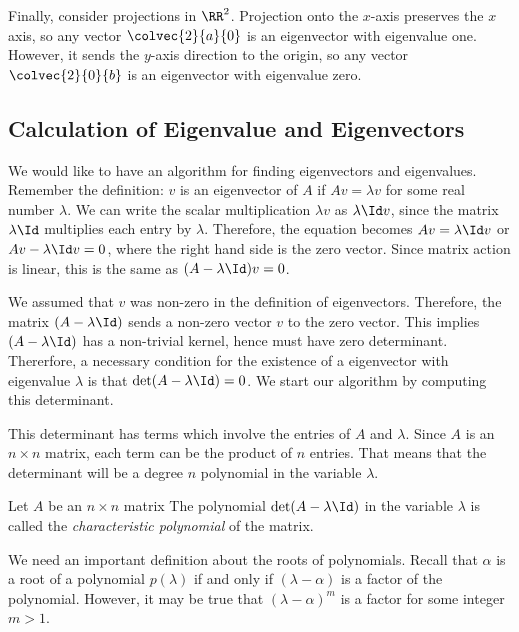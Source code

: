 \documentclass[fleqn]{report}
\begin{document}
\begin{example}
Finally, consider projections in $\RR^2$. Projection onto the
$x$-axis preserves the $x$ axis, so any vector
$\colvec{2}{a}{0}$ is an eigenvector with eigenvalue one.
However, it sends the $y$-axis direction to the origin, so any
vector $\colvec{2}{0}{b}$ is an eigenvector with eigenvalue
zero.
\end{example}

\subsection{Calculation of Eigenvalue and Eigenvectors}
\label{eigenvectors-calculation}

We would like to have an algorithm for finding eigenvectors
and eigenvalues. Remember the definition: $v$ is an
eigenvector of $A$ if $Av = \lambda v$ for some real number
$\lambda$. We can write the scalar multiplication $\lambda v$
as $\lambda \Id v$, since the matrix $\lambda \Id$ 
multiplies each entry by $\lambda$. Therefore, the equation
becomes $Av = \lambda \Id v$ or $Av - \lambda \Id v = 0$,
where the right hand side is the zero vector. Since matrix
action is linear, this is the same as $(A - \lambda \Id) v =
0$. 

We assumed that $v$ was non-zero in the definition of
eigenvectors. Therefore, the matrix $(A - \lambda \Id)$ sends
a non-zero vector $v$ to the zero vector. This implies $(A -
\lambda \Id)$ has a non-trivial kernel, hence must have zero
determinant. Thererfore, a necessary condition for
the existence of a eigenvector with eigenvalue $\lambda$ is
that $\det (A - \lambda \Id) = 0$. We start our algorithm by
computing this determinant.

This determinant has terms which involve the entries of $A$
and $\lambda$. Since $A$ is an $n \times n$ matrix, each term
can be the product of $n$ entries. That means that the
determinant will be a degree $n$ polynomial in the variable
$\lambda$. 

\begin{defn}
Let $A$ be an $n \times n$ matrix The polynomial $\det (A -
\lambda \Id)$ in the variable $\lambda$ is called the
\emph{characteristic polynomial} of the matrix. 
\end{defn}

We need an important definition about the roots of
polynomials. Recall that $\alpha$ is a root of a polynomial
$p(\lambda)$ if and only if $(\lambda - \alpha)$ is a factor
of the polynomial. However, it may be true that $(\lambda -
\alpha)^m$ is a factor for some integer $m>1$. 
\end{document}
